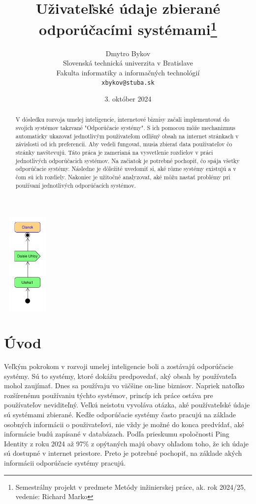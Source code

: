 \documentclass[10pt,twoside,slovak,a4paper]{article}
\title{Uživateľské údaje zbierané odporúčacími systémami\thanks{Semestrálny projekt v predmete Metódy inžinierskej práce, ak. rok 2024/25, vedenie: Richard Marko}} %
\author{Dmytro Bykov\\[2pt]
	{\small Slovenská technická univerzita v Bratislave}\\
	{\small Fakulta informatiky a informačných technológií}\\
	{\small \texttt{xbykov@stuba.sk}}
	}
\date{\small 3. október 2024} %
\begin{document}
\maketitle

\begin{abstract}
V dôsledku rozvoja umelej inteligencie, internetové biznisy začali implementovať do svojich systémov takzvané "Odporúčacie systémy". S ich pomocou môže mechanizmus automaticky ukazovať jednotlivým použivateľom odlišný obsah na internet stránkach v závislosti od ich preferencii. Aby vedeli fungovať, musia zbierať data použivateľov čo stránky navštevujú. Táto práca je zamerianá na vysvetlenie rozdielov v práci jednotlivých odporúčacich systémov. Na začiatok je potrebné pochopiť, čo spája všetky odporúčacie systémy. Následne je dôležité uvedomiť si, aké rôzne systémy existujú a v čom sú ich rozdiely. Nakoniec je užitočné analyzovať, aké môžu nastať problémy pri používaní jednotlivých odporúčacích systémov.
\end{abstract}

\includegraphics[height =2in,width=1in]{progres_mip.pdf}

\section{Úvod}

Veľkým pokrokom v rozvoji umelej inteligencie boli a zostávajú odporúčacie systémy. Sú to systémy, ktoré dokážu predpovedať, aký obsah by používateľa mohol zaujímať. Dnes sa používaju vo väčšine on-line biznisov. Napriek natoľko rozšírenému používaniu týchto systémov, princíp ich práce ostáva pre používateľov neviditeľný. Veľkú neistotu vyvoláva otázka, aké používateľské údaje sú systémami zbierané. Keďže odporúčacie systémy často pracujú na základe osobných informácii o použivateľovi, nie vždy je možné do konca predvídať, aké informácie budú zapísané v databázach. Podľa prieskumu spoločnosti Ping Identity z roku 2024 až 97\% z opýtaných majú obavy ohľadom toho, že ich údaje sú dostupné v internet priestore\cite{Ping:Fear}. Preto je potrebné pochopiť, na základe akých informácii odporúčacie systémy pracujú. 
\end{document}
